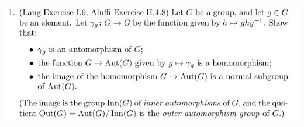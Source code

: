 \documentclass[12pt,letterpaper,boxed]{hmcpset}
\begin{document}


\begin{problem}
	\includegraphics[scale=0.9]{1.png}
	\hfill
\end{problem}
\end{document}
